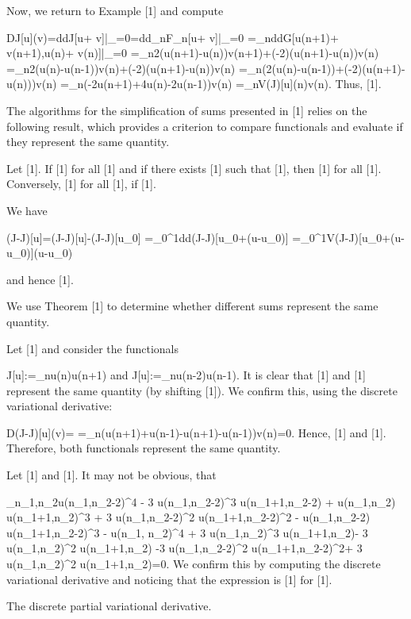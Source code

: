 \documentclass{article}
\begin{document}
{Now, we return to Example [1] and compute
	
		D{J}[u](v)={d}{d}{J}[u+ v]|_{=0}={d}{d}_{n}F_n[u+ v]|_{=0}
		=_{n}{d}{d}G[u(n+1)+ v(n+1),u(n)+ v(n)]|_{=0}
		=_{n}2(u(n+1)-u(n))v(n+1)+(-2)(u(n+1)-u(n))v(n)
		=_{n}2(u(n)-u(n-1))v(n)+(-2)(u(n+1)-u(n))v(n)
		=_{n}(2(u(n)-u(n-1))+(-2)(u(n+1)-u(n)))v(n)
		=_{n}(-2u(n+1)+4u(n)-2u(n-1))v(n)
		=_{n}{V}({J})[u](n)v(n).
Thus, [1].

The algorithms for the simplification of sums presented in [1] relies on the following result, which 
provides a criterion to compare functionals and evaluate if they represent the same quantity.


	Let [1]. If [1] for all [1] and if there exists [1] such that [1], then
	[1]
	for all [1].
	Conversely,
	[1]
	for all [1], if [1].


	We have
	
		({J}-{{J}})[u]=({J}-{{J}})[u]-({J}-{{J}})[u_0]
		=_{0}^{1}{d}{d}({J}-{{J}})[u_0+(u-u_0)]\lambda
		=_{0}^{1}{V}({J}-{{J}})[u_0+(u-u_0)](u-u_0)
	
	and hence [1].

We use Theorem [1] to determine whether different sums represent the same quantity.

	Let [1] and consider the functionals
	
		{J}[u]:=_{n}u(n)u(n+1){ and }
		{{J}}[u]:=_{n}u(n-2)u(n-1).
	It is clear that [1] and [1] represent the same quantity (by shifting [1]). We confirm this, using the discrete variational derivative:
	
		D({J}-{{J}})[u](v)=
		=_{n}(u(n+1)+u(n-1)-u(n+1)-u(n-1))v(n)=0.
	Hence, [1] and [1]. Therefore, both functionals represent the same quantity.



	Let [1] and [1]. It may not be obvious, that
	
		_{n_1,n_2}u(n_1,n_2-2)^4 - 3 u(n_1,n_2-2)^3 u(n_1+1,n_2-2) + 
		u(n_1,n_2) u(n_1+1,n_2)^3 + 3 u(n_1,n_2-2)^2 u(n_1+1,n_2-2)^2 -
		u(n_1,n_2-2) u(n_1+1,n_2-2)^3
		- u(n_1, n_2)^4 +
		3 u(n_1,n_2)^3 u(n_1+1,n_2)- 3 u(n_1,n_2)^2 u(n_1+1,n_2)
		-3 u(n_1,n_2-2)^2 u(n_1+1,n_2-2)^2+ 3 u(n_1,n_2)^2 u(n_1+1,n_2)=0.
	We confirm this by computing the discrete variational derivative and noticing that the expression is [1] for [1].



The discrete partial variational derivative.




}
\end{document}
